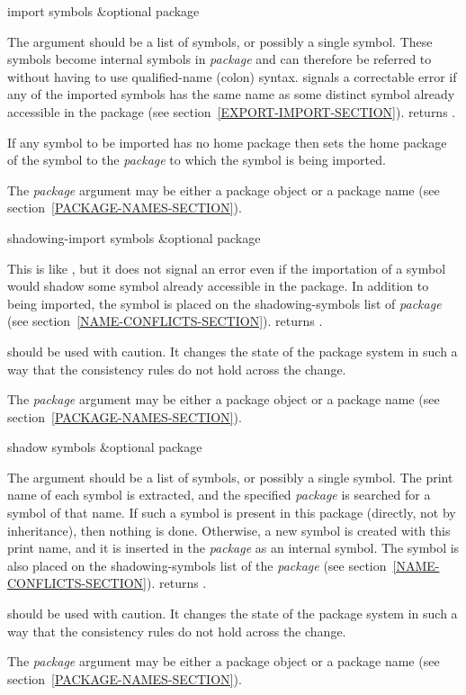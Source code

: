 \begin{defun}[Function]
import symbols &optional package

The argument should be a list of symbols, or possibly a single symbol.
These symbols become internal symbols in \emph{package} and can therefore
be referred to without having to use qualified-name (colon) syntax.
 signals a
correctable error if any of the imported symbols has the same name as
some distinct symbol already accessible in the package
(see section~\ref{EXPORT-IMPORT-SECTION}).
 returns {\true}.

If any symbol to be imported has no home package
then  sets the home package of the symbol to the
\emph{package} to which the symbol is being imported.

The \emph{package} argument may be either a package object
or a package name (see section~\ref{PACKAGE-NAMES-SECTION}).
\end{defun}

\begin{defun}[Function]
shadowing-import symbols &optional package

This is like , but it does not signal an error even if the
importation of a symbol would shadow some symbol already accessible in
the package.  In addition to being imported, the symbol is placed on the
shadowing-symbols list of \emph{package}
(see section~\ref{NAME-CONFLICTS-SECTION}).
 returns {\true}.

 should be used with
caution.  It changes the state of the package system in such a way that
the consistency rules do not hold across the change.

The \emph{package} argument may be either a package object
or a package name (see section~\ref{PACKAGE-NAMES-SECTION}).
\end{defun}

\begin{defun}[Function]
shadow symbols &optional package

The argument should be a list of symbols, or possibly a single symbol.
The print name of each symbol is extracted, and the specified \emph{package} is
searched for a symbol of that name.  If such a symbol is present in this
package (directly, not by inheritance), then nothing is done.  Otherwise,
a new symbol is created with this print name, and it is inserted in the
\emph{package} as an internal symbol.  The symbol is also placed on the
shadowing-symbols list of the \emph{package}
(see section~\ref{NAME-CONFLICTS-SECTION}).
 returns {\true}.

 should be used with
caution.  It changes the state of the package system in such a way that
the consistency rules do not hold across the change.

The \emph{package} argument may be either a package object
or a package name (see section~\ref{PACKAGE-NAMES-SECTION}).
\end{defun}

